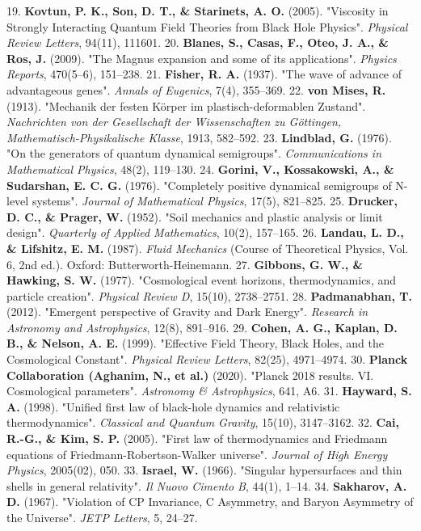 \documentclass[11pt,a4paper]{article}
\theoremstyle{definition}\newtheorem{definition}{Definition}
\theoremstyle{remark}\newtheorem{remark}{Remark}
\begin{document}
19. \textbf{Kovtun, P. K., Son, D. T., \& Starinets, A. O.} (2005). "Viscosity in Strongly Interacting Quantum Field Theories from Black Hole Physics". \textit{Physical Review Letters}, 94(11), 111601.
20. \textbf{Blanes, S., Casas, F., Oteo, J. A., \& Ros, J.} (2009). "The Magnus expansion and some of its applications". \textit{Physics Reports}, 470(5–6), 151–238.
21. \textbf{Fisher, R. A.} (1937). "The wave of advance of advantageous genes". \textit{Annals of Eugenics}, 7(4), 355–369.
22. \textbf{von Mises, R.} (1913). "Mechanik der festen Körper im plastisch-deformablen Zustand". \textit{Nachrichten von der Gesellschaft der Wissenschaften zu Göttingen, Mathematisch-Physikalische Klasse}, 1913, 582–592.
23. \textbf{Lindblad, G.} (1976). "On the generators of quantum dynamical semigroups". \textit{Communications in Mathematical Physics}, 48(2), 119–130.
24. \textbf{Gorini, V., Kossakowski, A., \& Sudarshan, E. C. G.} (1976). "Completely positive dynamical semigroups of N-level systems". \textit{Journal of Mathematical Physics}, 17(5), 821–825.
25. \textbf{Drucker, D. C., \& Prager, W.} (1952). "Soil mechanics and plastic analysis or limit design". \textit{Quarterly of Applied Mathematics}, 10(2), 157–165.
26. \textbf{Landau, L. D., \& Lifshitz, E. M.} (1987). \textit{Fluid Mechanics} (Course of Theoretical Physics, Vol. 6, 2nd ed.). Oxford: Butterworth-Heinemann.
27. \textbf{Gibbons, G. W., \& Hawking, S. W.} (1977). "Cosmological event horizons, thermodynamics, and particle creation". \textit{Physical Review D}, 15(10), 2738–2751.
28. \textbf{Padmanabhan, T.} (2012). "Emergent perspective of Gravity and Dark Energy". \textit{Research in Astronomy and Astrophysics}, 12(8), 891–916.
29. \textbf{Cohen, A. G., Kaplan, D. B., \& Nelson, A. E.} (1999). "Effective Field Theory, Black Holes, and the Cosmological Constant". \textit{Physical Review Letters}, 82(25), 4971–4974.
30. \textbf{Planck Collaboration (Aghanim, N., et al.)} (2020). "Planck 2018 results. VI. Cosmological parameters". \textit{Astronomy \& Astrophysics}, 641, A6.
31. \textbf{Hayward, S. A.} (1998). "Unified first law of black-hole dynamics and relativistic thermodynamics". \textit{Classical and Quantum Gravity}, 15(10), 3147–3162.
32. \textbf{Cai, R.-G., \& Kim, S. P.} (2005). "First law of thermodynamics and Friedmann equations of Friedmann-Robertson-Walker universe". \textit{Journal of High Energy Physics}, 2005(02), 050.
33. \textbf{Israel, W.} (1966). "Singular hypersurfaces and thin shells in general relativity". \textit{Il Nuovo Cimento B}, 44(1), 1–14.
34. \textbf{Sakharov, A. D.} (1967). "Violation of CP Invariance, C Asymmetry, and Baryon Asymmetry of the Universe". \textit{JETP Letters}, 5, 24–27.
\end{document}
